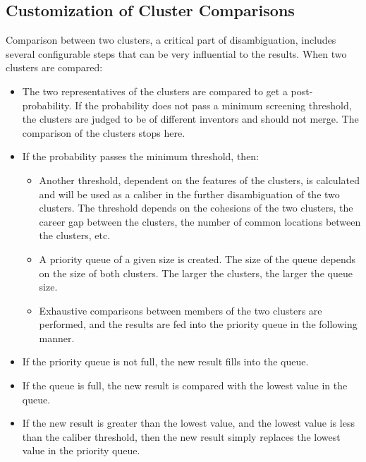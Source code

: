 \documentclass{article}
\begin{document}
\subsection{Customization of Cluster Comparisons}

Comparison between two clusters, a critical part of
disambiguation, includes several configurable
steps that can be very influential to the results.
When two clusters are compared:

\begin{itemize}

\item  The two representatives of the clusters are compared
to get a post-probability. If the probability does not pass
a minimum screening threshold, the clusters are judged to be of
different inventors and should not merge. The comparison of
the clusters stops here.

\item If the probability passes the minimum threshold, then:

\begin{itemize}

\item Another threshold, dependent on the features of the
clusters, is calculated and will be used as a caliber in the
further disambiguation of the two clusters. The threshold
depends on the cohesions of the two clusters, the career
gap between the clusters, the number of common locations
between the clusters, etc.

\item A priority queue of a given size is created. The size
of the queue depends on the size of both clusters. The larger
the clusters, the larger the queue size.

\item Exhaustive comparisons between members of the two
clusters are performed, and the results are fed into the
priority queue in the following manner.

\end{itemize}

\item If the priority queue is not full, the new result fills into the queue.

\item If the queue is full, the new result is compared with the lowest value in the
queue.

\item If the new result is greater than the lowest value, and the lowest
value is less than the caliber threshold, then the new result simply
replaces the lowest value in the priority queue.


\end{itemize}
\end{document}

